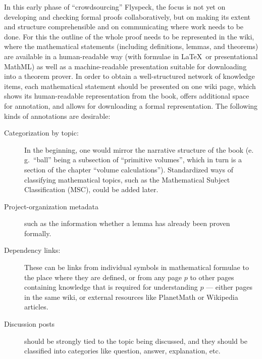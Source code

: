 \documentclass{llncs}
\begin{document}
In this early phase of ``crowdsourcing'' Flyspeck, the focus is not yet on developing and
checking formal proofs collaboratively, but on making its extent and structure
comprehensible and on communicating where work needs to be done.  For this the outline of
the whole proof needs to be represented in the wiki, where the mathematical
statements (including definitions, lemmas, and theorems) are available in a human-readable
way (with formulae in \LaTeX\ or presentational MathML) as well as a machine-readable
presentation suitable for downloading into a theorem prover.  In order to obtain a
well-structured network of knowledge items, each mathematical statement should be
presented on one wiki page, which shows its human-readable representation from the book,
offers additional space for annotation, and allows for downloading a formal
representation.  The following kinds of annotations are desirable:

\begin{description}
\item[Categorization by topic:] In the beginning, one would mirror the narrative structure
  of the book (e.\,g.\ ``ball'' being a subsection of ``primitive volumes'', which in turn
  is a section of the chapter ``volume calculations'').  Standardized ways of classifying
  mathematical topics, such as the Mathematical Subject Classification
  (MSC), could be added later.
\item[Project-organization metadata] such as the information whether a lemma has already
  been proven formally.
\item[Dependency links:] These can be links from individual symbols in mathematical
  formulae to the place where they are defined, or from any page $p$ to other pages
  containing knowledge that is required for understanding $p$ --- either pages in the same
  wiki, or external resources like PlanetMath or Wikipedia articles.
\item[Discussion posts] should be strongly tied to the topic being discussed, and they
  should be classified into categories like question, answer, explanation,
  etc.
\end{description}
\end{document}
